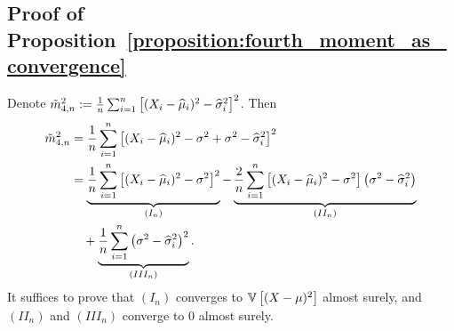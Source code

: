 \subsection{Proof of Proposition~\ref{proposition:fourth_moment_as_convergence}} \label{proof:fourth_moment_as_convergence}

Denote $\tilde m_{4, n}^2 := \frac{1}{n} \sum_{i = 1}^n \left[ (X_i - \widehat\mu_i)^2 - \widehat\sigma_i^2 \right]^2 $. Then
    \begin{align*}
        \tilde m_{4, n}^2 &= \frac{1}{n} \sum_{i = 1}^n \left[ (X_i - \widehat\mu_i)^2 - \sigma^2 + \sigma^2 - \widehat\sigma_i^2 \right]^2
        \\&= \underbrace{\frac{1}{n} \sum_{i = 1}^n \left[ (X_i - \widehat\mu_i)^2 - \sigma^2 \right]^2}_{(I_n)} 
        -  \underbrace{\frac{2}{n} \sum_{i = 1}^n \left[ (X_i - \widehat\mu_i)^2 - \sigma^2 \right] \left( \sigma^2 - \widehat\sigma_i^2 \right)}_{(II_n)}
        \\&\quad+ \underbrace{\frac{1}{n} \sum_{i = 1}^n \left( \sigma^2 - \widehat\sigma_i^2 \right)^2}_{(III_n)}.
    \end{align*}
    It suffices to prove that $(I_n)$ converges to $\mathbb{V} \left[(X-\mu)^2 \right]$ almost surely, and $(II_n)$ and $(III_n)$ converge to $0$ almost surely.

